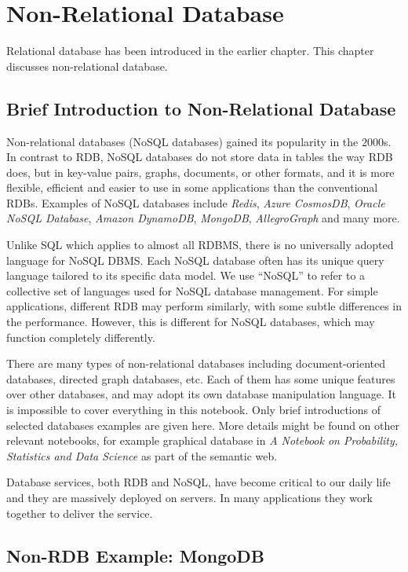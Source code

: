 \chapter{Non-Relational Database} 

Relational database has been introduced in the earlier chapter. This chapter discusses non-relational database.

\section{Brief Introduction to Non-Relational Database}

Non-relational databases (NoSQL databases) gained its popularity in the $2000$s. In contrast to RDB, NoSQL databases do not store data in tables the way RDB does, but in key-value pairs, graphs, documents, or other formats, and it is more flexible, efficient and easier to use in some applications than the conventional RDBs. Examples of NoSQL databases include \textit{Redis}, \textit{Azure CosmosDB}, \textit{Oracle NoSQL Database}, \textit{Amazon DynamoDB}, \textit{MongoDB}, \textit{AllegroGraph} and many more.

Unlike SQL which applies to almost all RDBMS, there is no universally adopted language for NoSQL DBMS. Each NoSQL database often has its unique query language tailored to its specific data model. We use ``NoSQL'' to refer to a collective set of languages used for NoSQL database management. For simple applications, different RDB may perform similarly, with some subtle differences in the performance. However, this is different for NoSQL databases, which may function completely differently.

There are many types of non-relational databases including document-oriented databases, directed graph databases, etc. Each of them has some unique features over other databases, and may adopt its own database manipulation language. It is impossible to cover everything in this notebook. Only brief introductions of selected databases examples are given here. More details might be found on other relevant notebooks, for example graphical database in \textit{A Notebook on Probability, Statistics and Data Science} as part of the semantic web.

Database services, both RDB and NoSQL, have become critical to our daily life and they are massively deployed on servers. In many applications they work together to deliver the service.

\section{Non-RDB Example: MongoDB}

